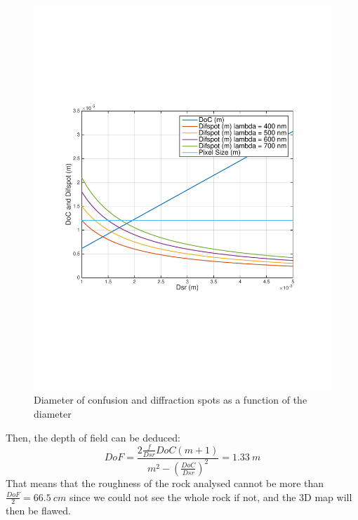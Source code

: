 \begin{figure}[H]
  \centering
  \includegraphics[trim=2cm 7cm 2cm 7cm, clip=true, totalheight=0.45\textheight, angle=0]{fig/DoCDifspot.pdf}
  \caption{Diameter of confusion and diffraction spots as a function of the diameter}
  \label{fig:DoCDifspot}
\end{figure}

Then, the depth of field can be deduced:
\begin{equation*}
DoF = \frac{2\frac{f}{Dsr}DoC(m+1)}{m^2 - (\frac{DoC}{Dsr})^2} = 1.33 \ m
\end{equation*}
That means that the roughness of the rock analysed cannot be more than $\frac{DoF}{2} =  66.5\ cm$ since we could not see the whole rock if not, and the 3D map will then be flawed.